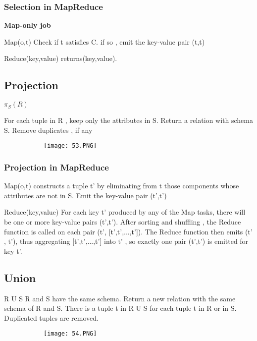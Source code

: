 \documentclass{article}
\begin{document}
\subsubsection{Selection in MapReduce}
\textbf{Map-only job}
\vspace{2mm}

Map(o,t)
Check if t satisfies C.
if so , emit the key-value pair (t,t)

Reduce(key,value)
returns(key,value).

\vspace{10mm}

\subsection{Projection}
$\pi_S(R)$

For each tuple in R , keep only the attributes in S.
Return a relation with schema S.
Remove duplicates , if any

\begin{figure}[ht!]
  \centering
  \begin{subfigure}[b]{0.5\linewidth}
    \texttt{[image: 53.PNG]}
  \end{subfigure}
\end{figure}

\subsubsection{Projection in MapReduce}

Map(o,t)
constructs a tuple t' by eliminating from t those components whose attributes are not in S.
Emit the key-value pair (t',t')

Reduce(key,value)
For each key t' produced by any of the Map tasks, there will be one or more key-value pairs (t',t').
After sorting and shuffling , the Reduce function is called on each pair (t', [t',t',...,t']).
The Reduce function then emits (t' , t'), thus aggregating [t',t',...,t'] into t' , so exactly one pair (t',t') is emitted for key t'.

\subsection{Union}
R U S
R and S have the same schema.
Return a new relation with the same schema of R and S.
There is a tuple t in R U S for each tuple t in R or in S.
Duplicated tuples are removed.

\begin{figure}[ht!]
  \centering
  \begin{subfigure}[b]{0.5\linewidth}
    \texttt{[image: 54.PNG]}
  \end{subfigure}
\end{figure}
\end{document}
